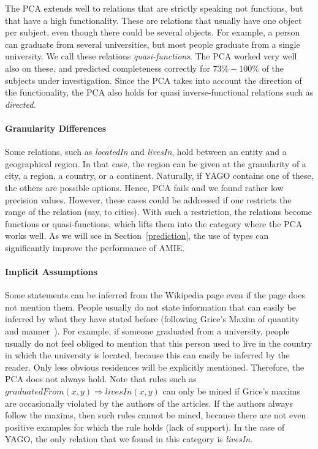 The PCA extends well to relations that are strictly speaking not functions, but that have a high functionality.
These are relations that usually have one object per subject, even though there could be several objects.
For example, a person can graduate from several universities, but most people graduate from a single university. We call these relations \emph{quasi-functions}.
The PCA worked very well also on these, and predicted completeness correctly for $73\%-100\%$
of the subjects under investigation. Since the PCA takes into account the direction of the functionality, the PCA also holds for quasi inverse-functional relations such as \emph{directed}.

\paragraph{Granularity Differences} Some relations, such as \emph{locatedIn} and \emph{livesIn}, hold between an entity and a geographical region.
In that case, the region can be given at the granularity of a city, a region, a country, or a continent.
Naturally, if YAGO contains one of these, the others are possible options. Hence, PCA fails and we found rather low precision values.
However, these cases could be addressed if one restricts the range of the relation (say, to cities).
With such a restriction, the relations become functions or quasi-functions, which lifts them into the category where the PCA works well.
As we will see in Section~\ref{prediction}, the use of types can significantly improve the performance of AMIE.

\paragraph{Implicit Assumptions} Some statements can be inferred from the Wikipedia page even if the page does not mention them. %
People usually do not state information that can easily be inferred by what they have stated before
(following Grice's Maxim of quantity and manner~\cite{grice}). %
For example, if someone graduated from a university, people usually do not feel obliged to mention that this person used to live in the country
 in which the university is located,
because this can easily be inferred by the reader. Only less obvious residences will be explicitly mentioned. Therefore, the PCA does not always hold.
Note that rules such as $graduatedFrom(x,y)\Rightarrow livesIn(x,y)$ can only be mined if Grice's maxims are occasionally violated by the authors of the articles.
If the authors always follow the maxims, then such rules cannot be mined, because there are not even positive examples for which the rule holds (lack of support).
In the case of YAGO, the only relation that we found in this category is \emph{livesIn}.


